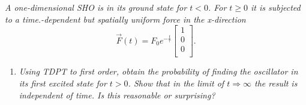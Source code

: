 \begin{example}
	\emph{A one-dimensional SHO is in its ground state for $t<0$. For $t\geq0$ it is subjected to a time.-dependent but spatially uniform force in the x-direction}
	\begin{equation}
		\vec{F}(t)=F_0e^{-\frac{t}{\tau}}\begin{bmatrix}
			1\\0\\0\\
		\end{bmatrix}.
	\end{equation} 
	
	\begin{enumerate}
		\item \emph{Using TDPT to first order, obtain the probability of finding the oscillator in its first excited state for $t>0$. Show that in the limit of $t\Rightarrow \infty$ the result is independent of time. Is this reasonable or surprising?} \newline
		

\end{enumerate}
\end{example}
